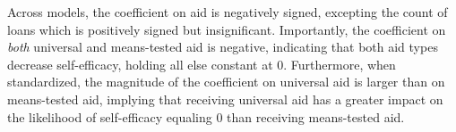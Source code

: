 \documentclass[12pt]{paper}
\begin{document}
Across models, the coefficient on aid is negatively signed, excepting the count of loans which is positively signed but insignificant. Importantly, the coefficient on \textit{both} universal and means-tested aid is negative, indicating that both aid types decrease self-efficacy, holding all else constant at 0. Furthermore, when standardized, the magnitude of the coefficient on universal aid is larger than on means-tested aid, implying that receiving universal aid has a greater impact on the likelihood of self-efficacy equaling 0 than receiving means-tested aid.

\end{document}
